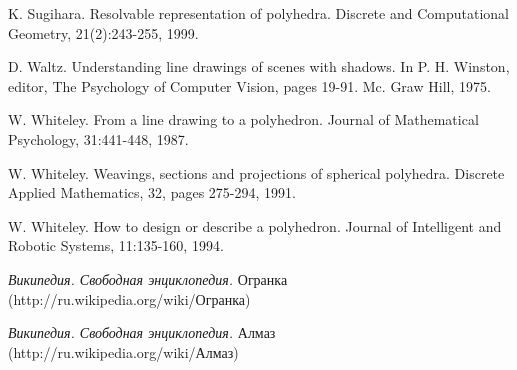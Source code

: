 \documentclass[a4paper,12pt, titlepage]{article}
\begin{document}
\begin{thebibliography}{99}
K. Sugihara. Resolvable representation of polyhedra. 
Discrete and Computational Geometry, 21(2):243-255, 1999.

D. Waltz. Understanding line drawings of scenes with 
shadows. In P. H. Winston, editor, The Psychology of Computer
Vision, pages 19-91. Mc. Graw Hill, 1975.

W. Whiteley. From a line drawing to a polyhedron. Journal
of Mathematical Psychology, 31:441-448, 1987.

W. Whiteley. Weavings, sections and projections of 
spherical polyhedra. Discrete Applied Mathematics, 32, pages
275-294, 1991.

W. Whiteley. How to design or describe a polyhedron.
Journal of Intelligent and Robotic Systems, 11:135-160,
1994.

\textit{Википедия. Свободная энциклопедия.} Огранка\\
(http://ru.wikipedia.org/wiki/Огранка)

\textit{Википедия. Свободная энциклопедия.} Алмаз\\
(http://ru.wikipedia.org/wiki/Алмаз)

\end{thebibliography}
\end{document}
